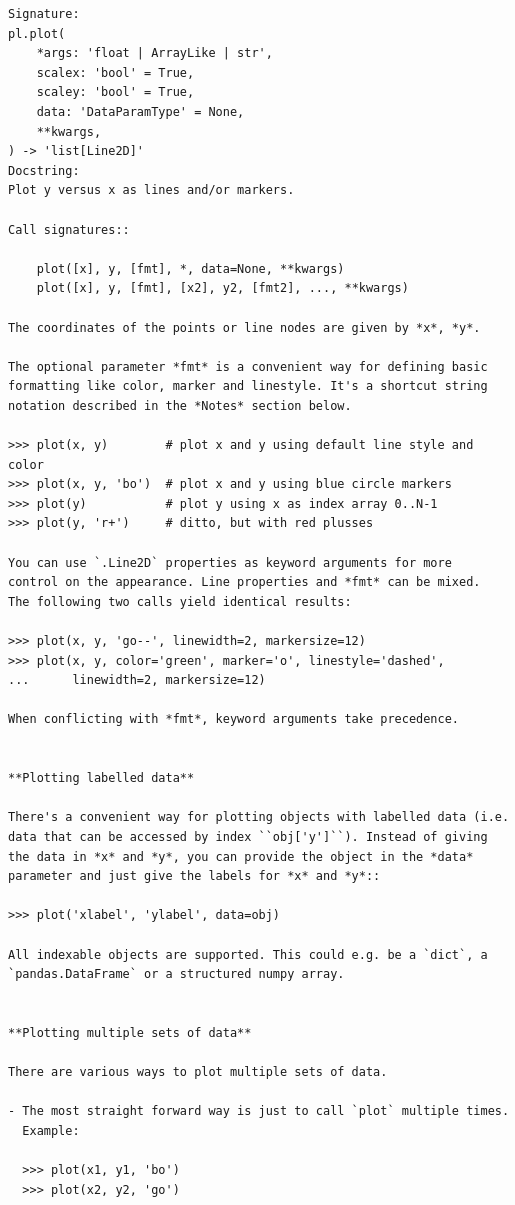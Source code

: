 \documentclass[
  letterpaper,
  DIV=11,
  numbers=noendperiod]{scrreprt}
\begin{document}
\begin{verbatim}
Signature:
pl.plot(
    *args: 'float | ArrayLike | str',
    scalex: 'bool' = True,
    scaley: 'bool' = True,
    data: 'DataParamType' = None,
    **kwargs,
) -> 'list[Line2D]'
Docstring:
Plot y versus x as lines and/or markers.

Call signatures::

    plot([x], y, [fmt], *, data=None, **kwargs)
    plot([x], y, [fmt], [x2], y2, [fmt2], ..., **kwargs)

The coordinates of the points or line nodes are given by *x*, *y*.

The optional parameter *fmt* is a convenient way for defining basic
formatting like color, marker and linestyle. It's a shortcut string
notation described in the *Notes* section below.

>>> plot(x, y)        # plot x and y using default line style and color
>>> plot(x, y, 'bo')  # plot x and y using blue circle markers
>>> plot(y)           # plot y using x as index array 0..N-1
>>> plot(y, 'r+')     # ditto, but with red plusses

You can use `.Line2D` properties as keyword arguments for more
control on the appearance. Line properties and *fmt* can be mixed.
The following two calls yield identical results:

>>> plot(x, y, 'go--', linewidth=2, markersize=12)
>>> plot(x, y, color='green', marker='o', linestyle='dashed',
...      linewidth=2, markersize=12)

When conflicting with *fmt*, keyword arguments take precedence.


**Plotting labelled data**

There's a convenient way for plotting objects with labelled data (i.e.
data that can be accessed by index ``obj['y']``). Instead of giving
the data in *x* and *y*, you can provide the object in the *data*
parameter and just give the labels for *x* and *y*::

>>> plot('xlabel', 'ylabel', data=obj)

All indexable objects are supported. This could e.g. be a `dict`, a
`pandas.DataFrame` or a structured numpy array.


**Plotting multiple sets of data**

There are various ways to plot multiple sets of data.

- The most straight forward way is just to call `plot` multiple times.
  Example:

  >>> plot(x1, y1, 'bo')
  >>> plot(x2, y2, 'go')


\end{verbatim}
\end{document}
